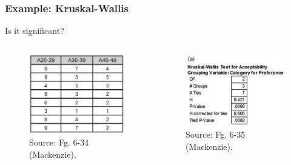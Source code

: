 \documentclass{beamer}
\begin{document}
\begin{frame}
	\frametitle{Example: Kruskal-Wallis} 
	Is it significant?
	\begin{columns}[c] %
		
		\begin{figure}
			\includegraphics[width=0.8\linewidth]{6-34}
			\caption{Source: Fg. 6-34 (Mackenzie).}
		\end{figure}
		
		\begin{figure}
			\includegraphics[width=0.9\linewidth]{6-35}
			\caption{Source: Fg. 6-35 (Mackenzie).}
		\end{figure}
	\end{columns}
\end{frame}
\end{document}
